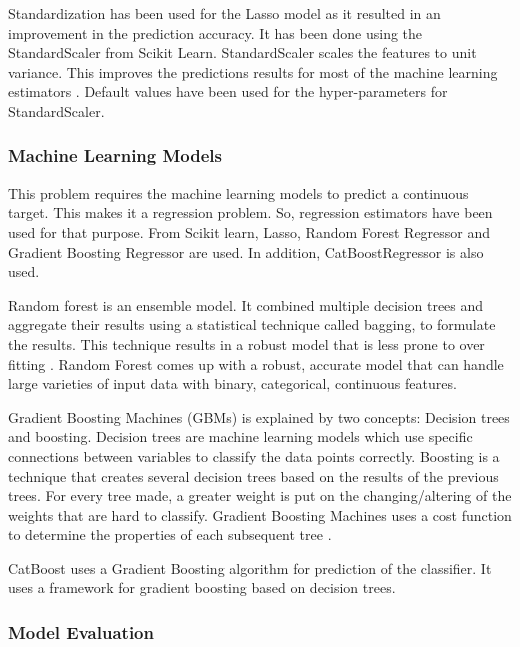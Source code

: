 \documentclass[sigconf, nonacm, natbib, screen, balance=False]{acmart}
\begin{document}
Standardization has been used for the Lasso model as it resulted in an improvement in the prediction accuracy. It has been done using the StandardScaler from Scikit Learn. StandardScaler scales the features to unit variance. This improves the predictions results for most of the machine learning estimators \citep[Ch.~2]{Rashka2015}. Default values have been used for the hyper-parameters for StandardScaler.

\subsubsection{Machine Learning Models}\label{sec:ml_models}

This problem requires the machine learning models to predict a continuous target. This makes it a regression problem. So, regression estimators have been used for that purpose. From Scikit learn, Lasso, Random Forest Regressor and Gradient Boosting Regressor are used. In addition, CatBoostRegressor is also used.



Random forest is an ensemble model. It combined multiple decision trees and aggregate their results using a statistical technique called bagging, to formulate the results. This technique results in a robust model that is less prone to over fitting \cite{Varghese18:online}. Random Forest comes up with a robust, accurate model that can handle large varieties of input data with binary, categorical, continuous features.

Gradient Boosting Machines (GBMs) is explained by two concepts: Decision trees and boosting. Decision trees are machine learning models which use specific connections between variables to classify the data points correctly. Boosting is a technique that creates several decision trees based on the results of the previous trees. For every tree made, a greater weight is put on the changing/altering of the weights that are hard to classify. Gradient Boosting Machines uses a cost function to determine the properties of each subsequent tree \cite{gb18:online}.

CatBoost uses a Gradient Boosting algorithm for prediction of the classifier. It uses a framework for gradient boosting based on decision trees\cite{CatBoost90:online}.

\subsubsection{Model Evaluation}\label{sec:evaul}
\end{document}
